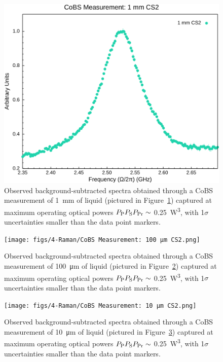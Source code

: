 \begin{figure}[t]
  \centering
  \hspace{-2em}\includegraphics[width=.85\textwidth]{figs/4-Raman/CoBS Measurement: 1 mm CS2.png}
  \caption{Observed background-subtracted spectra obtained through a \ac{CoBS} measurement of \SI{1}{\milli\meter} of liquid  (pictured in Figure~\ref{fig:Raman:1mmCS2}) captured at maximum operating optical powers \(P_{\rm P}P_{\rm S}P_{\rm Pr} \sim\) \SI{0.25}{\cubic\watt}, with 1\(\sigma\) uncertainties smaller than the data point markers.}
  \label{fig:Raman:1mmCS2}
\end{figure}

\begin{figure}[t]
  \centering
  \hspace{-2em}\texttt{[image: figs/4-Raman/CoBS Measurement: 100 μm CS2.png]}
  \caption{Observed background-subtracted spectra obtained through a \ac{CoBS} measurement of \SI{100}{\micro\meter} of liquid  (pictured in Figure~\ref{fig:Raman:100umCS2}) captured at maximum operating optical powers \(P_{\rm P}P_{\rm S}P_{\rm Pr} \sim\) \SI{0.25}{\cubic\watt}, with 1\(\sigma\) uncertainties smaller than the data point markers.}
  \label{fig:Raman:100umCS2}
\end{figure}

\begin{figure}[t]
  \centering
  \hspace{-2em}\texttt{[image: figs/4-Raman/CoBS Measurement: 10 μm CS2.png]}
  \caption{Observed background-subtracted spectra obtained through a \ac{CoBS} measurement of \SI{10}{\micro\meter} of liquid  (pictured in Figure~\ref{fig:Raman:10umCS2}) captured at maximum operating optical powers \(P_{\rm P}P_{\rm S}P_{\rm Pr} \sim\) \SI{0.25}{\cubic\watt}, with 1\(\sigma\) uncertainties smaller than the data point markers.}
  \label{fig:Raman:10umCS2}
\end{figure}

